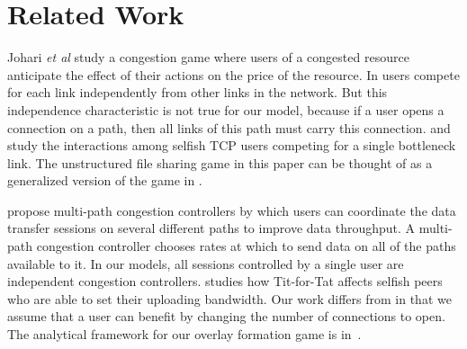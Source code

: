\documentclass[conference]{IEEEtran}
\begin{document}
%


\section{Related Work}\label{sec:related}


Johari \textit{et al} \cite{johari04allocation} study a congestion
game where users of a congested resource anticipate the effect of
their actions on the price of the resource.
In \cite{johari04allocation} users compete for each link
independently from other links in the network. But this
independence characteristic is not true for our model, because if
a user opens a connection on a path, then all links of this path
must carry this connection. \cite{akella02selfish} and
\cite{zhang05tcpgame_icnp} study the interactions among selfish
TCP users competing for a single bottleneck link. The unstructured
file sharing game in this paper can be thought of as a generalized
version of the game in \cite{zhang05tcpgame_icnp}.

\cite{kelly05joint}\cite{han07overlay_tcp} propose multi-path
congestion controllers by which users can coordinate the data
transfer sessions on several different paths to improve data
throughput. A multi-path congestion controller chooses rates at
which to send data on all of the paths available to it.
In our models, all sessions controlled by a single user are
independent congestion controllers.
\cite{qiu04bt} studies how Tit-for-Tat affects selfish peers who
are able to set their uploading bandwidth. Our work differs from
\cite{qiu04bt} in that we assume that a user can benefit by
changing the number of connections to open. The analytical
framework for our overlay formation game is in~\cite{jackson04}.
\end{document}
